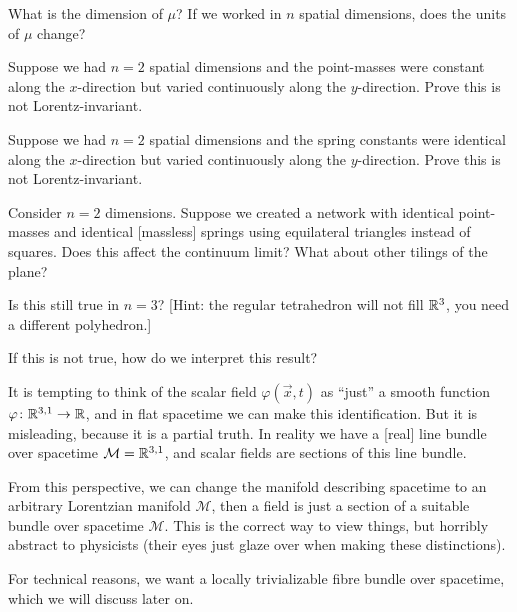 \begin{exercise}
What is the dimension of $\mu$? 
If we worked in $n$ spatial dimensions, does the units of $\mu$ change?
\end{exercise}

\begin{exercise}
Suppose we had $n=2$ spatial dimensions and the point-masses were
constant along the $x$-direction but varied continuously along the
$y$-direction. Prove this is not Lorentz-invariant.
\end{exercise}

\begin{exercise}
Suppose we had $n=2$ spatial dimensions and the spring constants were
identical along the $x$-direction but varied continuously along the
$y$-direction. Prove this is not Lorentz-invariant.
\end{exercise}


\begin{exercise}
Consider $n=2$ dimensions. Suppose we created a network with identical
point-masses and identical [massless] springs using equilateral
triangles instead of squares. Does this affect the continuum limit?
What about other tilings of the plane?

Is this still true in $n=3$? [Hint: the regular tetrahedron will not
fill $\mathbb{R}^{3}$, you need a different polyhedron.]

If this is not true, how do we interpret this result?
\end{exercise}

It is tempting to think of the scalar field $\varphi(\vec{x},t)$ as
``just'' a smooth function $\varphi\colon\mathbb{R}^{3,1}\to\mathbb{R}$, and in flat
spacetime we can make this identification. But it is misleading, because
it is a partial truth. In reality we have a [real] line bundle over
spacetime $\mathcal{M}=\mathbb{R}^{3,1}$, and scalar fields are sections of
this line bundle.

From this perspective, we can change the manifold describing spacetime
to an arbitrary Lorentzian manifold $\mathcal{M}$, then a field is just
a section of a suitable bundle over spacetime $\mathcal{M}$.
This is the correct way to view things, but horribly abstract to
physicists (their eyes just glaze over when making these distinctions).

For technical reasons, we want a locally trivializable fibre bundle over
spacetime, which we will discuss later on.
